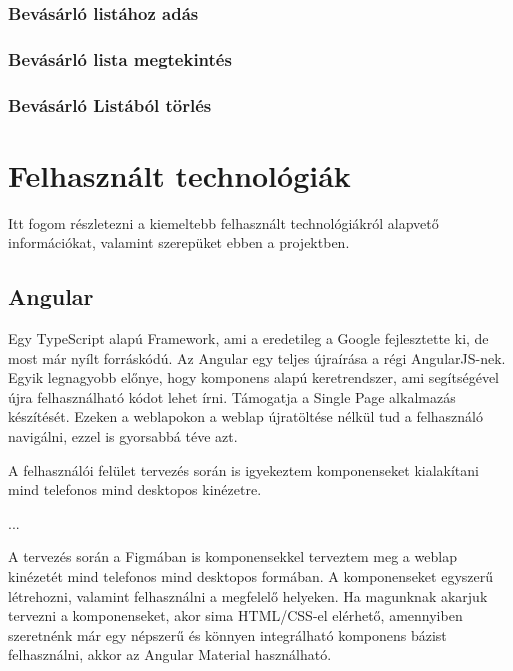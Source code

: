 \documentclass[12pt]{report}
\theoremstyle{definition}
\begin{document}
\subsection{Bevásárló listához adás}

\subsection{Bevásárló lista megtekintés}

\subsection{Bevásárló Listából törlés}







\chapter{Felhasznált technológiák}
Itt fogom részletezni a kiemeltebb felhasznált technológiákról alapvető információkat, valamint szerepüket ebben a projektben.

\section{Angular}
Egy TypeScript alapú Framework, ami a eredetileg a Google fejlesztette ki, de most már nyílt forráskódú. Az Angular egy teljes újraírása a régi AngularJS-nek. Egyik legnagyobb előnye, hogy komponens alapú keretrendszer, ami segítségével újra felhasználható kódot lehet írni. Támogatja a Single Page alkalmazás készítését. Ezeken a weblapokon a weblap újratöltése nélkül tud a felhasználó navigálni, ezzel is gyorsabbá téve azt.

A felhasználói felület tervezés során is igyekeztem komponenseket kialakítani mind telefonos mind desktopos kinézetre.

...

A tervezés során a Figmában is komponensekkel terveztem meg a weblap kinézetét mind telefonos mind desktopos formában. A komponenseket egyszerű létrehozni, valamint felhasználni a megfelelő helyeken. Ha magunknak akarjuk tervezni a komponenseket, akor sima HTML/CSS-el elérhető, amennyiben szeretnénk már egy népszerű és könnyen integrálható komponens bázist felhasználni, akkor az Angular Material használható.
\end{document}
